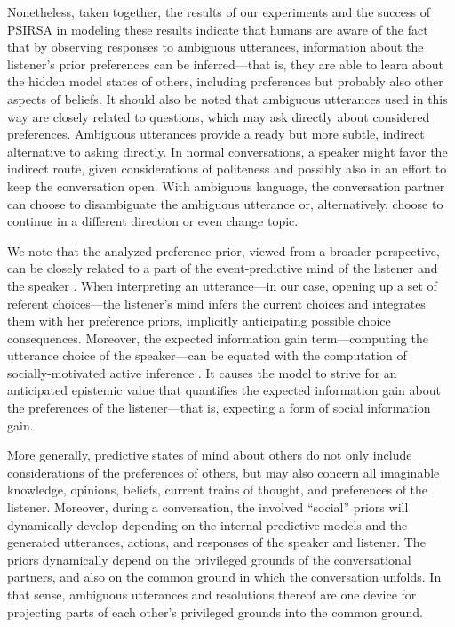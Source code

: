\documentclass[10pt,a4paper]{article}
\begin{document}
Nonetheless, taken together, the results of our experiments and the success of PSIRSA in modeling these results indicate that humans are aware of the fact that by observing responses to ambiguous utterances, information about the listener's prior preferences can be inferred---that is, they are able to learn about the hidden model states of others, including preferences but probably also other aspects of beliefs. 
It should also be noted that ambiguous utterances used in this way are closely related to questions, which may ask directly about considered preferences. 
Ambiguous utterances provide a ready but more subtle, indirect alternative to asking directly. 
In normal conversations, a speaker might favor the indirect route, given considerations of politeness and possibly also in an effort to keep the conversation open. 
With ambiguous language, the conversation partner can choose to disambiguate the ambiguous utterance or, alternatively, choose to continue in a different direction or even change topic.


We note that the analyzed preference prior, viewed from a broader perspective, can be closely related to a part of the event-predictive mind of the listener and the speaker \cite{Butz:2016,Butz:2017}. 
When interpreting an utterance---in our case, opening up a set of referent choices---the listener's mind infers the current choices and integrates them with her preference priors, implicitly anticipating possible choice consequences.
Moreover, the expected information gain term---computing the utterance choice of the speaker---can be equated with the computation of socially-motivated active inference \cite{Butz:2017a,Friston:2015}.
It causes the model to strive for an anticipated epistemic value that quantifies the expected information gain about the preferences of the listener---that is, expecting a form of social information gain. 


More generally, predictive states of mind about others do not only include considerations of the preferences of others, but may also concern all imaginable knowledge, opinions, beliefs, current trains of thought, and preferences of the listener.
Moreover, during a conversation, the involved ``social'' priors will dynamically develop depending on the internal predictive models and the generated utterances, actions, and responses of the speaker and listener. 
The priors dynamically depend on the privileged grounds of the conversational partners, and also on the common ground in which the conversation unfolds.
In that sense, ambiguous utterances and resolutions thereof are one device for projecting parts of each other's privileged grounds into the common ground. 
\end{document}
